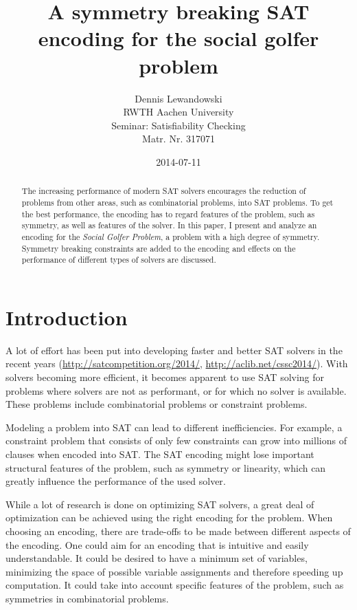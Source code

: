 \documentclass[a4paper]{scrartcl}
\title{A symmetry breaking SAT encoding for the social golfer problem}
\author{Dennis Lewandowski \\
    RWTH Aachen University \\
    Seminar: Satisfiability Checking \\
    Matr. Nr. 317071
    }
\date{2014-07-11}
\begin{document}
\maketitle

\begin{abstract}

The increasing performance of modern SAT solvers encourages the reduction of problems from other areas, such as combinatorial problems, into SAT problems. To get the best performance, the encoding has to regard features of the problem, such as symmetry, as well as features of the solver. In this paper, I present and analyze an encoding for the \emph{Social Golfer Problem}, a problem with a high degree of symmetry. Symmetry breaking constraints are added to the encoding and effects on the performance of different types of solvers are discussed. 

\end{abstract}

\section{Introduction}

A lot of effort has been put into developing faster and better SAT solvers in the recent years (\url{http://satcompetition.org/2014/}, \url{http://aclib.net/cssc2014/}). With solvers becoming more efficient, it becomes apparent to use SAT solving for problems where solvers are not as performant, or for which no solver is available. These problems include combinatorial problems or constraint problems.

Modeling a problem into SAT can lead to different inefficiencies. For example, a constraint problem that consists of only few constraints can grow into millions of clauses when encoded into SAT. The SAT encoding might lose important structural features of the problem, such as symmetry or linearity, which can greatly influence the performance of the used solver\cite{ramani}.

While a lot of research is done on optimizing SAT solvers, a great deal of optimization can be achieved using the right encoding for the problem. When choosing an encoding, there are trade-offs to be made between different aspects of the encoding. One could aim for an encoding that is intuitive and easily understandable. It could be desired to have a minimum set of variables, minimizing the space of possible variable assignments and therefore speeding up computation. It could take into account specific features of the problem, such as symmetries in combinatorial problems.
\end{document}
